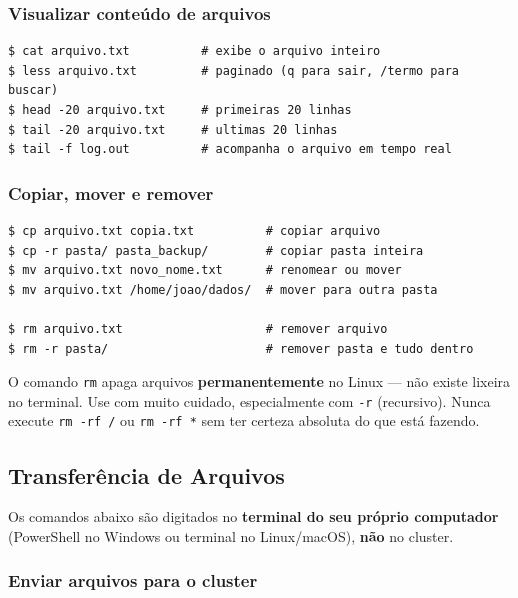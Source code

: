 \documentclass[11pt, a4paper]{article}
\newcommand{\cmd}[1]{\texttt{\textcolor{codeblue}{#1}}}
\begin{document}
\subsubsection{Visualizar conteúdo de arquivos}

\begin{lstlisting}[style=terminal]
$ cat arquivo.txt          # exibe o arquivo inteiro
$ less arquivo.txt         # paginado (q para sair, /termo para buscar)
$ head -20 arquivo.txt     # primeiras 20 linhas
$ tail -20 arquivo.txt     # ultimas 20 linhas
$ tail -f log.out          # acompanha o arquivo em tempo real
\end{lstlisting}

\subsubsection{Copiar, mover e remover}

\begin{lstlisting}[style=terminal]
$ cp arquivo.txt copia.txt          # copiar arquivo
$ cp -r pasta/ pasta_backup/        # copiar pasta inteira
$ mv arquivo.txt novo_nome.txt      # renomear ou mover
$ mv arquivo.txt /home/joao/dados/  # mover para outra pasta

$ rm arquivo.txt                    # remover arquivo
$ rm -r pasta/                      # remover pasta e tudo dentro
\end{lstlisting}

\begin{perigo}
  O comando \cmd{rm} apaga arquivos \textbf{permanentemente} no Linux --- não
  existe lixeira no terminal. Use com muito cuidado, especialmente com
  \texttt{-r} (recursivo). Nunca execute \texttt{rm -rf /} ou
  \texttt{rm -rf *} sem ter certeza absoluta do que está fazendo.
\end{perigo}

\subsection{Transferência de Arquivos}

Os comandos abaixo são digitados no \textbf{terminal do seu próprio computador}
(PowerShell no Windows ou terminal no Linux/macOS), \textbf{não} no cluster.

\subsubsection{Enviar arquivos para o cluster}
\end{document}
